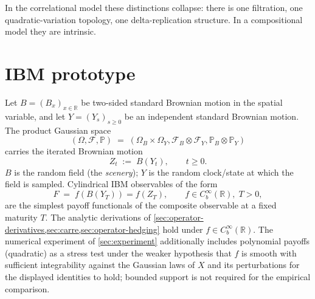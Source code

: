 \documentclass[11pt,reqno]{amsart}
\theoremstyle{plain}
\theoremstyle{definition}
\theoremstyle{remark}
\newcommand{\R}{\mathbb R}
\newcommand{\Prob}{\mathbb P}
\newcommand{\cF}{\mathcal F}
\newcommand{\IBM}{Z}
\newcommand{\Bvar}{B}
\newcommand{\Yclock}{Y}
\begin{document}
In the correlational model these distinctions collapse: there
is one filtration, one quadratic-variation topology, one
delta-replication structure. In a compositional model they are
intrinsic.

\section{IBM prototype}\label{sec:IBM-prototype}

Let $\Bvar=(\Bvar_{x})_{x\in\R}$ be two-sided standard Brownian
motion in the spatial variable, and let
$\Yclock=(\Yclock_{s})_{s\ge 0}$ be an independent standard
Brownian motion. The product Gaussian space
\[
  (\Omega,\cF,\Prob)\;=\;(\Omega_{\Bvar}\times\Omega_{\Yclock},
   \cF_{\Bvar}\otimes\cF_{\Yclock},
   \Prob_{\Bvar}\otimes\Prob_{\Yclock})
\]
carries the iterated Brownian motion
\begin{equation}\label{eq:IBM-def}
  \IBM_{t}\;:=\;\Bvar(\Yclock_{t}),\qquad t\ge 0.
\end{equation}
$\Bvar$ is the random field (the \emph{scenery}); $\Yclock$ is
the random clock/state at which the field is sampled.
Cylindrical IBM observables of the form
\begin{equation}\label{eq:IBM-payoff}
  F\;=\;f(\Bvar(\Yclock_{T}))=f(\IBM_{T}),
   \qquad f\in C_{b}^{\infty}(\R),\;T>0,
\end{equation}
are the simplest payoff functionals of the composite observable
at a fixed maturity $T$. The analytic derivations of
\cref{sec:operator-derivatives,sec:carre,sec:operator-hedging}
hold under $f\in C_{b}^{\infty}(\R)$. The numerical experiment
of \cref{sec:experiment} additionally includes polynomial
payoffs (quadratic) as a stress test under the weaker
hypothesis that $f$ is smooth with sufficient integrability
against the Gaussian laws of $X$ and its perturbations for the
displayed identities to hold; bounded support is not required
for the empirical comparison.
\end{document}
